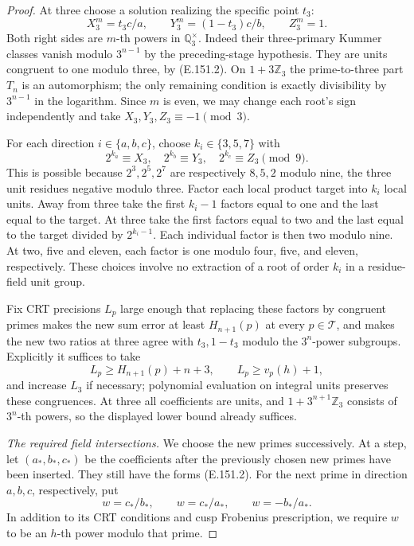\begin{proof}
At three choose a solution realizing the specific point \(t_3\):
\[
 X_3^m=t_3c/a,\qquad Y_3^m=(1-t_3)c/b,
 \qquad Z_3^m=1.
 \tag{E.151.5}
\]
Both right sides are \(m\)-th powers in \(\mathbb Q_3^\times\).
Indeed their three-primary Kummer classes vanish modulo
\(3^{n-1}\) by the preceding-stage hypothesis. They are units
congruent to one modulo three, by (E.151.2). On \(1+3\mathbb Z_3\)
the prime-to-three part \(T_n\) is an automorphism; the only
remaining condition is exactly divisibility by \(3^{n-1}\) in
the logarithm. Since \(m\) is even, we may change each root's
sign independently and take
\(X_3,Y_3,Z_3\equiv-1\pmod3\).

For each direction \(i\in\{a,b,c\}\), choose
\(k_i\in\{3,5,7\}\) with
\[
 2^{k_a}\equiv X_3,\quad 2^{k_b}\equiv Y_3,
 \quad 2^{k_c}\equiv Z_3\pmod9.
 \tag{E.151.6}
\]
This is possible because \(2^3,2^5,2^7\) are respectively
\(8,5,2\) modulo nine, the three unit residues negative modulo
three. Factor each local product target into \(k_i\) local units.
Away from three take the first \(k_i-1\) factors equal to one
and the last equal to the target. At three take the first factors
equal to two and the last equal to the target divided by
\(2^{k_i-1}\). Each individual factor is then two modulo nine.
At two, five and eleven, each factor is one modulo four, five,
and eleven, respectively. These choices involve no extraction
of a root of order \(k_i\) in a residue-field unit group.

Fix CRT precisions \(L_p\) large enough that replacing these
factors by congruent primes makes the new sum error at least
\(H_{n+1}(p)\) at every \(p\in\mathcal T\), and makes the
new two ratios at three agree with \(t_3,1-t_3\) modulo the
\(3^n\)-power subgroups. Explicitly it suffices to take
\[
 L_p\ge H_{n+1}(p)+n+3,
 \qquad L_p\ge v_p(h)+1,
 \tag{E.151.7}
\]
and increase \(L_3\) if necessary; polynomial evaluation on
integral units preserves these congruences. At three all coefficients
are units, and \(1+3^{n+1}\mathbb Z_3\) consists of
\(3^n\)-th powers, so the displayed lower bound already suffices.

\emph{The required field intersections.}
We choose the new primes successively. At a step, let
\((a_*,b_*,c_*)\) be the coefficients after the previously
chosen new primes have been inserted. They still have the forms
(E.151.2). For the next prime in direction \(a,b,c\), respectively,
put
\[
 w=c_*/b_*,\qquad w=c_*/a_*,\qquad w=-b_*/a_*.
 \tag{E.151.8}
\]
In addition to its CRT conditions and cusp Frobenius prescription,
we require \(w\) to be an \(h\)-th power modulo that prime.


\end{proof}
